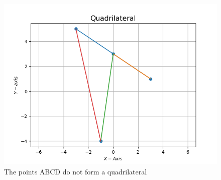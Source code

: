 \documentclass[10pt]{article}
\begin{document}
\begin{figure}[H]
			\centering
			\includegraphics[width=\columnwidth]{figs/Figure_1.png}
			\caption{The points ABCD do not form a quadrilateral}
			\label{fig:7}
		\end{figure}
\end{document}
